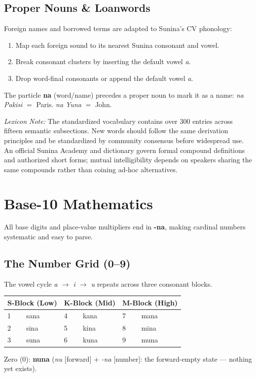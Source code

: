 \documentclass[12pt, a4paper]{article}
\begin{document}
\subsection{Proper Nouns \& Loanwords}
Foreign names and borrowed terms are adapted to Sunina's CV phonology:
\begin{enumerate}
    \item Map each foreign sound to its nearest Sunina consonant and vowel.
    \item Break consonant clusters by inserting the default vowel \textit{a}.
    \item Drop word-final consonants or append the default vowel \textit{a}.
\end{enumerate}
The particle \textbf{na} (word/name) precedes a proper noun to mark it as a name: \quad \textit{na Pakisi} $=$ Paris. \quad \textit{na Yuna} $=$ John.

\vspace{0.5em}
\textit{Lexicon Note:} The standardized vocabulary contains over 300 entries across fifteen semantic subsections. New words should follow the same derivation principles and be standardized by community consensus before widespread use. An official Sunina Academy and dictionary govern formal compound definitions and authorized short forms; mutual intelligibility depends on speakers sharing the same compounds rather than coining ad-hoc alternatives.

\newpage

\section{Base-10 Mathematics}
All base digits and place-value multipliers end in \textbf{-na}, making cardinal numbers systematic and easy to parse.

\subsection{The Number Grid (0--9)}
The vowel cycle \textit{a $\rightarrow$ i $\rightarrow$ u} repeats across three consonant blocks.

\vspace{0.5em}
\begin{tabular}{@{}ll|ll|ll@{}}
\toprule
\multicolumn{2}{c|}{\textbf{S-Block (Low)}} & \multicolumn{2}{c|}{\textbf{K-Block (Mid)}} & \multicolumn{2}{c}{\textbf{M-Block (High)}} \\ \midrule
1 & sana & 4 & kana & 7 & mana \\
2 & sina & 5 & kina & 8 & mina \\
3 & suna & 6 & kuna & 9 & muna \\ \bottomrule
\end{tabular}
\quad Zero (0): \textbf{nuna} (\textit{nu} [forward] + \textit{-na} [number]: the forward-empty state --- nothing yet exists).
\end{document}
